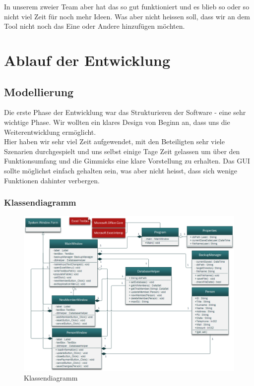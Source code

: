\documentclass{article}
\begin{document}
In unserem zweier Team aber hat das so gut funktioniert und es blieb so oder so nicht viel Zeit für noch mehr Ideen. Was aber nicht heissen soll, dass wir an dem Tool nicht noch das Eine oder Andere hinzufügen möchten.

\newpage


\section{Ablauf der Entwicklung}

\subsection{Modellierung}
Die erste Phase der Entwicklung war das Strukturieren der Software - eine sehr wichtige Phase. Wir wollten ein klares Design von Beginn an, dass uns die Weiterentwicklung ermöglicht.\\
Hier haben wir sehr viel Zeit aufgewendet, mit den Beteiligten sehr viele Szenarien durchgespielt und uns selbst einige Tage Zeit gelassen um über den Funktionsumfang und die Gimmicks eine klare Vorstellung zu erhalten. Das GUI sollte möglichst einfach gehalten sein, was aber nicht heisst, dass sich wenige Funktionen dahinter verbergen. 

\subsubsection{Klassendiagramm}
	
\begin{figure}[h]
	\centering
	\includegraphics[width=1 \textwidth]{KlassendiagrammBild}
	\caption{Klassendiagramm}
\end{figure}
\end{document}
